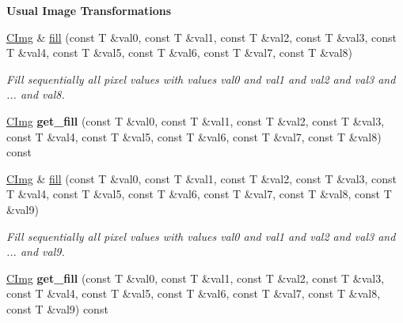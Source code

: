 \begin{Indent}{\bf Usual Image Transformations}
\begin{DoxyCompactItemize}
\item 
\hyperlink{structcimg__library_1_1_c_img}{CImg} \& \hyperlink{structcimg__library_1_1_c_img_ad6e690a3d3ef39d3a87a5832e33cf45f}{fill} (const T \&val0, const T \&val1, const T \&val2, const T \&val3, const T \&val4, const T \&val5, const T \&val6, const T \&val7, const T \&val8)
\begin{DoxyCompactList}\small\item\em Fill sequentially all pixel values with values {\itshape val0\/} and {\itshape val1\/} and {\itshape val2\/} and {\itshape val3\/} and {\itshape \/}... and {\itshape val8\/}. \item\end{DoxyCompactList}\item 
\hypertarget{structcimg__library_1_1_c_img_ab06a2c7a08e59e21f745d2e3862364c2}{
\hyperlink{structcimg__library_1_1_c_img}{CImg} {\bfseries get\_\-fill} (const T \&val0, const T \&val1, const T \&val2, const T \&val3, const T \&val4, const T \&val5, const T \&val6, const T \&val7, const T \&val8) const }
\label{structcimg__library_1_1_c_img_ab06a2c7a08e59e21f745d2e3862364c2}

\item 
\hyperlink{structcimg__library_1_1_c_img}{CImg} \& \hyperlink{structcimg__library_1_1_c_img_a78959e122bf52f3baa2ac57f7ee6d654}{fill} (const T \&val0, const T \&val1, const T \&val2, const T \&val3, const T \&val4, const T \&val5, const T \&val6, const T \&val7, const T \&val8, const T \&val9)
\begin{DoxyCompactList}\small\item\em Fill sequentially all pixel values with values {\itshape val0\/} and {\itshape val1\/} and {\itshape val2\/} and {\itshape val3\/} and {\itshape \/}... and {\itshape val9\/}. \item\end{DoxyCompactList}\item 
\hypertarget{structcimg__library_1_1_c_img_ab4ad1daeca241dd2fd9f7074a3385867}{
\hyperlink{structcimg__library_1_1_c_img}{CImg} {\bfseries get\_\-fill} (const T \&val0, const T \&val1, const T \&val2, const T \&val3, const T \&val4, const T \&val5, const T \&val6, const T \&val7, const T \&val8, const T \&val9) const }
\label{structcimg__library_1_1_c_img_ab4ad1daeca241dd2fd9f7074a3385867}


\end{DoxyCompactItemize}
\end{Indent}
